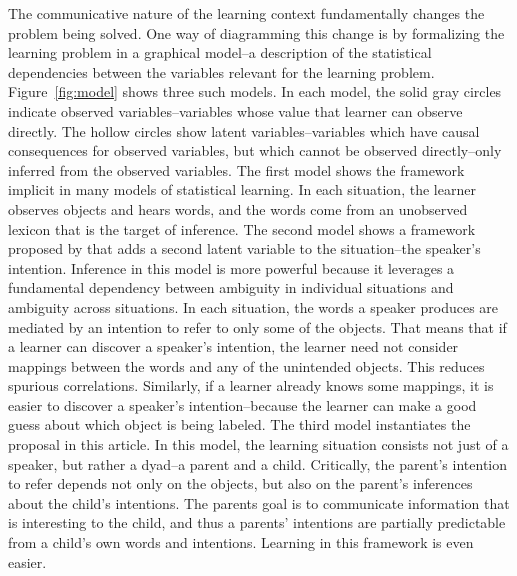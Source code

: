\documentclass[review]{elsarticle}
\begin{document}
The communicative nature of the learning context fundamentally changes the problem being solved. One way of diagramming this change is by formalizing the learning problem in a graphical model--a description of the statistical dependencies between the variables relevant for the learning problem. Figure~\ref{fig:model} shows three such models. In each model, the solid gray circles indicate observed variables--variables whose value that learner can observe directly. The hollow circles show latent variables--variables which have causal consequences for observed variables, but which cannot be observed directly--only inferred from the observed variables. The first model shows the framework implicit in many models of statistical learning. In each situation, the learner observes objects and hears words, and the words come from an unobserved lexicon that is the target of inference. The second model shows a framework proposed by \cite{frank2009} that adds a second latent variable to the situation--the speaker's intention. Inference in this model is more powerful because it leverages a fundamental dependency between ambiguity in individual situations and ambiguity across situations. In each situation, the words a speaker produces are mediated by an intention to refer to only some of the objects. That means that if a learner can discover a speaker's intention, the learner need not consider mappings between the words and any of the unintended objects. This reduces spurious correlations. Similarly, if a learner already knows some mappings, it is easier to discover a speaker's intention--because the learner can make a good guess about which object is being labeled. The third model instantiates the proposal in this article. In this model, the learning situation consists not just of a speaker, but rather a dyad--a parent and a child. Critically, the parent's intention to refer depends not only on the objects, but also on the parent's inferences about the child's intentions. The parents goal is to communicate information that is interesting to the child, and thus a parents' intentions are partially predictable from a child's own words and intentions. Learning in this framework is even easier.
\end{document}
